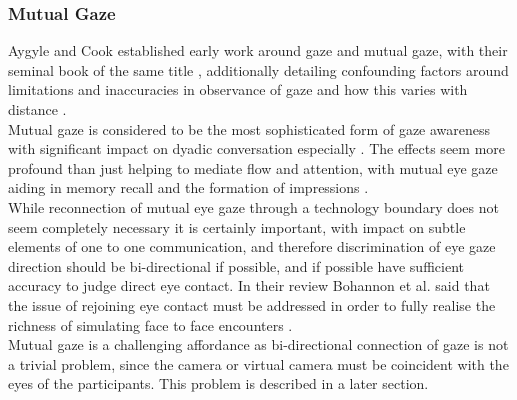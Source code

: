 \subsubsection{Mutual Gaze}
Aygyle and Cook established early work around gaze and mutual gaze, with their seminal book of the same title \cite{argyle1976gaze}, additionally detailing confounding factors around limitations and inaccuracies in observance of gaze and how this varies with distance \cite{Argyle1969} \cite{Argyle} \cite{Cook1977}.\\
Mutual gaze is considered to be the most sophisticated form of gaze awareness with significant impact on dyadic conversation especially \cite{Cook1977, Kleinke1986a, Fagel2010}. The effects seem more profound than just helping to mediate flow and attention, with mutual eye gaze aiding in memory recall and the formation of impressions \cite{Bohannon2013}.\\
While reconnection of mutual eye gaze through a technology boundary does not seem completely necessary it is certainly important, with impact on subtle elements of one to one communication, and therefore discrimination of eye gaze direction should be bi-directional if possible, and if possible have sufficient accuracy to judge direct eye contact. In their review Bohannon et al. said that the issue of rejoining eye contact must be addressed in order to fully realise the richness of simulating face to face encounters \cite{Bohannon2013}.\\
Mutual gaze is a challenging affordance as bi-directional connection of gaze is not a trivial problem, since the camera or virtual camera must be coincident with the eyes of the participants. This problem is described in a later section.
